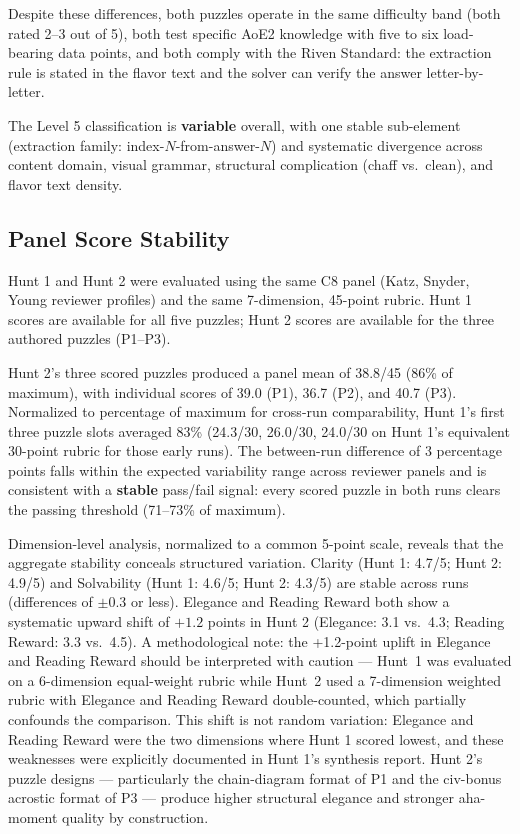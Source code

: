 Despite these differences, both puzzles operate in the same difficulty band (both rated 2--3 out of 5), both test specific AoE2 knowledge with five to six load-bearing data points, and both comply with the Riven Standard: the extraction rule is stated in the flavor text and the solver can verify the answer letter-by-letter.

The Level 5 classification is \textbf{variable} overall, with one stable sub-element (extraction family: index-$N$-from-answer-$N$) and systematic divergence across content domain, visual grammar, structural complication (chaff vs.\ clean), and flavor text density.

\subsection{Panel Score Stability}
\label{sec:results-panel}

Hunt 1 and Hunt 2 were evaluated using the same C8 panel (Katz, Snyder, Young reviewer profiles) and the same 7-dimension, 45-point rubric. Hunt 1 scores are available for all five puzzles; Hunt 2 scores are available for the three authored puzzles (P1--P3).

Hunt 2's three scored puzzles produced a panel mean of 38.8/45 (86\% of maximum), with individual scores of 39.0 (P1), 36.7 (P2), and 40.7 (P3). Normalized to percentage of maximum for cross-run comparability, Hunt 1's first three puzzle slots averaged 83\% (24.3/30, 26.0/30, 24.0/30 on Hunt 1's equivalent 30-point rubric for those early runs). The between-run difference of 3 percentage points falls within the expected variability range across reviewer panels and is consistent with a \textbf{stable} pass/fail signal: every scored puzzle in both runs clears the passing threshold (71--73\% of maximum).

Dimension-level analysis, normalized to a common 5-point scale, reveals that the aggregate stability conceals structured variation. Clarity (Hunt 1: 4.7/5; Hunt 2: 4.9/5) and Solvability (Hunt 1: 4.6/5; Hunt 2: 4.3/5) are stable across runs (differences of $\pm 0.3$ or less). Elegance and Reading Reward both show a systematic upward shift of $+1.2$ points in Hunt 2 (Elegance: 3.1 vs.\ 4.3; Reading Reward: 3.3 vs.\ 4.5). A methodological note: the +1.2-point uplift in Elegance and Reading Reward should be interpreted with caution --- Hunt~1 was evaluated on a 6-dimension equal-weight rubric while Hunt~2 used a 7-dimension weighted rubric with Elegance and Reading Reward double-counted, which partially confounds the comparison. This shift is not random variation: Elegance and Reading Reward were the two dimensions where Hunt 1 scored lowest, and these weaknesses were explicitly documented in Hunt 1's synthesis report. Hunt 2's puzzle designs --- particularly the chain-diagram format of P1 and the civ-bonus acrostic format of P3 --- produce higher structural elegance and stronger aha-moment quality by construction.

